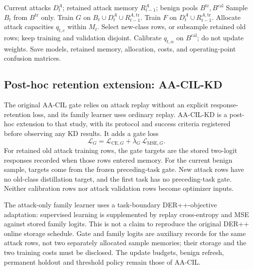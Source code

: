 \documentclass[10pt,twocolumn]{article}
\begin{document}
\begin{algorithm}[t]
\caption{One AA-CIL update}
\label{alg:aacil}
\begin{algorithmic}[1]
\Require Current attacks $D_t^A$; retained attack memory $R_{t-1}^A$; benign pools $B^{\mathrm{tr}},B^{\mathrm{cal}}$
\State Sample $B_t$ from $B^{\mathrm{tr}}$ only.
\State Train $G$ on $B_t\cup D_t^A\cup R_{t-1}^{A,\mathrm{tr}}$.
\State Train $F$ on $D_t^A\cup R_{t-1}^{A,\mathrm{tr}}$.
\State Allocate attack capacities $q_{t,c}$ within $M_t$.
\State Select new-class rows, or subsample retained old rows; keep training and validation disjoint.
\EndFor
\State Calibrate $q_{t,\alpha}$ on $B^{\mathrm{cal}}$; do not update weights.
\State Save models, retained memory, allocation, costs, and operating-point confusion matrices.
\end{algorithmic}
\end{algorithm}

\subsection{Post-hoc retention extension: AA-CIL-KD}
The original AA-CIL gate relies on attack replay without an explicit response-retention loss, and its family learner uses ordinary replay. AA-CIL-KD is a post-hoc extension to that study, with its protocol and success criteria registered before observing any KD results. It adds a gate loss
\begin{equation}
 \mathcal L_G=\mathcal L_{\mathrm{CE},G}
       +\lambda_G\,\mathcal L_{\mathrm{MSE},G}.
\end{equation}
For retained old attack training rows, the gate targets are the stored two-logit responses recorded when those rows entered memory. For the current benign sample, targets come from the frozen preceding-task gate. New attack rows have no old-class distillation target, and the first task has no preceding-task gate. Neither calibration rows nor attack validation rows become optimizer inputs.

The attack-only family learner uses a task-boundary DER++-objective adaptation: supervised learning is supplemented by replay cross-entropy and MSE against stored family logits. This is not a claim to reproduce the original DER++ online storage schedule. Gate and family logits are auxiliary records for the same attack rows, not two separately allocated sample memories; their storage and the two training costs must be disclosed. The update budgets, benign refresh, permanent holdout and threshold policy remain those of AA-CIL.
\end{document}
